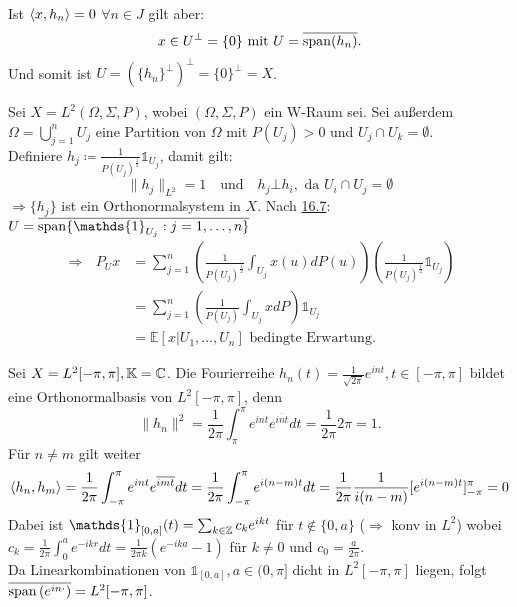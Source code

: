 \begin{beweis}
	Ist $ \langle x , h_{n} \rangle = 0$ $\forall n \in J$ gilt aber:
		\[ x \in U^{\bot} = \{ 0 \} \text{ mit } U = \overline{\operatorname{span}(h_{n})}. \] 
	Und somit ist $U = \left( \{ h_{n} \}^{\bot} \right)^{\bot} = \{ 0 \}^{\bot} = X$.
\end{beweis}


\begin{beispiel}
	Sei $X = L^{2}(\Omega, \Sigma, P)$, wobei $(\Omega, \Sigma, P)$ ein W-Raum sei. Sei au{\ss}erdem $\Omega = \bigcup_{j = 1}^{n} U_{j}$ eine Partition von $\Omega$ mit $P(U_{j}) > 0$ und $U_{j} \cap U_{k} = \emptyset$. \\
	Definiere $h_{j} \coloneqq \frac{1}{P(U_{j})^{\frac{1}{2}}} \mathds{1}_{U_{j}}$, damit gilt:
	\[ \| h_{j} \|_{L^{2}} = 1 \quad \text{und} \quad h_{j} \bot h_{i}, \text{ da } U_{i} \cap U_{j} = \emptyset  \]
	$\Rightarrow \{ h_{j} \}$ ist ein Orthonormalsystem in $X$. Nach \hyperref[satz:16.7]{16.7}: $U = \overline{\ospan\{\mathds{1}_{U_{j}}: j = 1, \dotsc, n\}}$ \\
	\begin{align*}
		\Rightarrow \text{ } P_{U} x & = \sum_{j = 1}^{n} \left( \frac{1}{P(U_{j})^{\frac{1}{2}}} \int_{U_{j}} x(u) dP(u) \right) \left( \frac{1}{P(U_{j})	^{\frac{1}{2}}} \mathds{1}_{U_{j}} \right) \\
		& = \sum_{j = 1}^{n} \left( \frac{1}{P(U_{j})} \int_{U_{j}} x dP \right) \mathds{1}_{U_{j}} \\
		& = \mathds{E}[x | U_{1}, \dotsc, U_{n}] \text{ bedingte Erwartung.}
	\end{align*}
\end{beispiel}


\begin{beispiel}
	Sei $X = L^{2}[-\pi, \pi], \mathbb{K} = \mathbb{C}$. Die Fourierreihe $h_{n}(t) = \frac{1}{\sqrt{2 \pi}} e^{int}, t \in [-\pi , \pi]$ bildet eine Orthonormalbasis von $L^{2}[-\pi, \pi]$, denn 
	\[ \| h_{n} \|^{2} = \frac{1}{2\pi} \int_{\pi}^{\pi} e^{int} e^{\overline{int}} dt = \frac{1}{2\pi} 2 \pi = 1. \]
	Für $n \neq m$ gilt weiter
	\[ \langle h_{n} , h_{m} \rangle = \frac{1}{2 \pi} \int_{- \pi}^{\pi} e^{int} e^{\overline{imt}} dt = \frac{1}{2 \pi} \int_{- \pi}^{\pi} e^{i(n - m)t} dt = \frac{1}{2 \pi} \frac{1}{i(n - m)} [ e^{i(n - m)t} ]_{-\pi}^{\pi} = 0 \]
	Dabei ist $\mathds{1}_{[0, a]}(t) = \sum_{k \in \MdZ} c_{k} e^{ikt}$ für $t \notin \{ 0, a \}$ ($\Rightarrow$ konv in $L^{2}$) wobei $c_{k} = \frac{1}{2 \pi} \int_{0}^{a} e^{-ikr} dt = \frac{1}{2 \pi k} \left( e^{-ika} - 1 \right)$ für $k \neq 0$ und $c_{0} = \frac{a}{2 \pi}$. \\
	Da Linearkombinationen von $\mathds{1}_{[0, a]}, a \in (0, \pi]$ dicht in $L^{2}[-\pi, \pi]$ liegen, folgt $\overline{\operatorname{span}\left(e^{in \cdot} \right)} = L^{2}[-\pi, \pi]$.
\end{beispiel}


